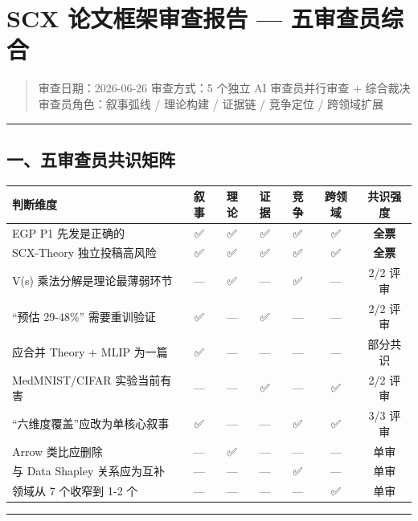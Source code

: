 \documentclass[
  12pt,
]{ctexart}
\author{SCX}
\date{2026}
\begin{document}
\section{SCX 论文框架审查报告 ---
五审查员综合}\label{scx-ux8bbaux6587ux6846ux67b6ux5ba1ux67e5ux62a5ux544a-ux4e94ux5ba1ux67e5ux5458ux7efcux5408}

\begin{quote}
审查日期：2026-06-26 审查方式：5 个独立 AI 审查员并行审查 + 综合裁决
审查员角色：叙事弧线 / 理论构建 / 证据链 / 竞争定位 / 跨领域扩展
\end{quote}

\begin{center}\rule{0.5\linewidth}{0.5pt}\end{center}

\subsection{一、五审查员共识矩阵}\label{ux4e00ux4e94ux5ba1ux67e5ux5458ux5171ux8bc6ux77e9ux9635}

\begin{longtable}[]{@{}lcccccc@{}}
\toprule\noalign{}
判断维度 & 叙事 & 理论 & 证据 & 竞争 & 跨领域 & 共识强度 \\
\midrule\noalign{}
\endhead
\bottomrule\noalign{}
\endlastfoot
EGP P1 先发是正确的 & ✅ & ✅ & ✅ & ✅ & ✅ & \textbf{全票} \\
SCX-Theory 独立投稿高风险 & ✅ & ✅ & ✅ & ✅ & ✅ & \textbf{全票} \\
V(s) 乘法分解是理论最薄弱环节 & --- & ✅ & --- & ✅ & --- & 2/2 评审 \\
``预估 29-48\%'' 需要重训验证 & ✅ & --- & ✅ & --- & --- & 2/2 评审 \\
应合并 Theory + MLIP 为一篇 & ✅ & --- & --- & --- & --- & 部分共识 \\
MedMNIST/CIFAR 实验当前有害 & --- & --- & ✅ & --- & ✅ & 2/2 评审 \\
``六维度覆盖''应改为单核心叙事 & ✅ & --- & --- & ✅ & ✅ & 3/3 评审 \\
Arrow 类比应删除 & --- & ✅ & --- & --- & --- & 单审 \\
与 Data Shapley 关系应为互补 & --- & --- & --- & ✅ & --- & 单审 \\
领域从 7 个收窄到 1-2 个 & --- & --- & --- & --- & ✅ & 单审 \\
\end{longtable}

\begin{center}\rule{0.5\linewidth}{0.5pt}\end{center}
\end{document}
